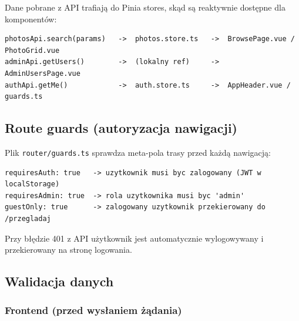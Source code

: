 \documentclass[12pt, a4paper]{article}
\begin{document}
Dane pobrane z API trafiają do Pinia stores, skąd są reaktywnie dostępne dla komponentów:

\begin{lstlisting}[style=plain, caption={Przepływ danych: API -> Store -> Komponent}]
photosApi.search(params)   ->  photos.store.ts   ->  BrowsePage.vue / PhotoGrid.vue
adminApi.getUsers()        ->  (lokalny ref)     ->  AdminUsersPage.vue
authApi.getMe()            ->  auth.store.ts     ->  AppHeader.vue / guards.ts
\end{lstlisting}

\subsection{Route guards (autoryzacja nawigacji)}

Plik \texttt{router/guards.ts} sprawdza meta-pola trasy przed każdą nawigacją:

\begin{lstlisting}[style=plain]
requiresAuth: true   -> uzytkownik musi byc zalogowany (JWT w localStorage)
requiresAdmin: true  -> rola uzytkownika musi byc 'admin'
guestOnly: true      -> zalogowany uzytkownik przekierowany do /przegladaj
\end{lstlisting}

Przy błędzie 401 z API użytkownik jest automatycznie wylogowywany i przekierowany
na stronę logowania.

\subsection{Walidacja danych}

\subsubsection{Frontend (przed wysłaniem żądania)}
\end{document}
